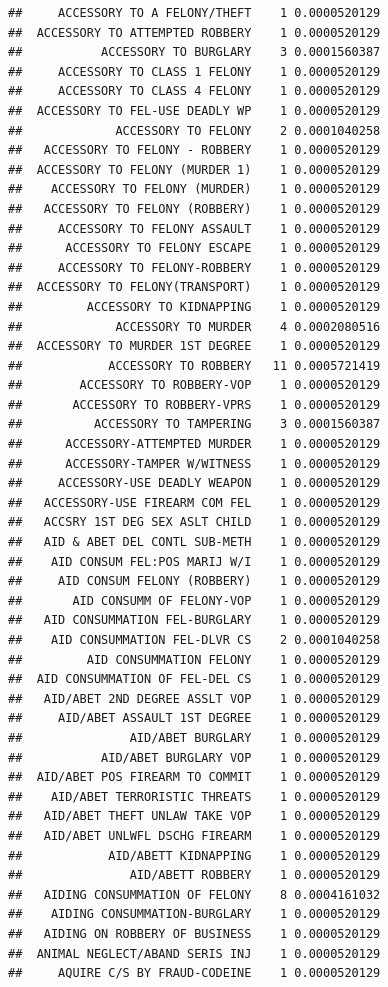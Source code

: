 \documentclass[]{book}
\begin{document}
\begin{verbatim}
##     ACCESSORY TO A FELONY/THEFT    1 0.0000520129
##  ACCESSORY TO ATTEMPTED ROBBERY    1 0.0000520129
##           ACCESSORY TO BURGLARY    3 0.0001560387
##     ACCESSORY TO CLASS 1 FELONY    1 0.0000520129
##     ACCESSORY TO CLASS 4 FELONY    1 0.0000520129
##  ACCESSORY TO FEL-USE DEADLY WP    1 0.0000520129
##             ACCESSORY TO FELONY    2 0.0001040258
##   ACCESSORY TO FELONY - ROBBERY    1 0.0000520129
##  ACCESSORY TO FELONY (MURDER 1)    1 0.0000520129
##    ACCESSORY TO FELONY (MURDER)    1 0.0000520129
##   ACCESSORY TO FELONY (ROBBERY)    1 0.0000520129
##     ACCESSORY TO FELONY ASSAULT    1 0.0000520129
##      ACCESSORY TO FELONY ESCAPE    1 0.0000520129
##     ACCESSORY TO FELONY-ROBBERY    1 0.0000520129
##  ACCESSORY TO FELONY(TRANSPORT)    1 0.0000520129
##         ACCESSORY TO KIDNAPPING    1 0.0000520129
##             ACCESSORY TO MURDER    4 0.0002080516
##  ACCESSORY TO MURDER 1ST DEGREE    1 0.0000520129
##            ACCESSORY TO ROBBERY   11 0.0005721419
##        ACCESSORY TO ROBBERY-VOP    1 0.0000520129
##       ACCESSORY TO ROBBERY-VPRS    1 0.0000520129
##          ACCESSORY TO TAMPERING    3 0.0001560387
##      ACCESSORY-ATTEMPTED MURDER    1 0.0000520129
##      ACCESSORY-TAMPER W/WITNESS    1 0.0000520129
##     ACCESSORY-USE DEADLY WEAPON    1 0.0000520129
##   ACCESSORY-USE FIREARM COM FEL    1 0.0000520129
##   ACCSRY 1ST DEG SEX ASLT CHILD    1 0.0000520129
##   AID & ABET DEL CONTL SUB-METH    1 0.0000520129
##    AID CONSUM FEL:POS MARIJ W/I    1 0.0000520129
##     AID CONSUM FELONY (ROBBERY)    1 0.0000520129
##       AID CONSUMM OF FELONY-VOP    1 0.0000520129
##   AID CONSUMMATION FEL-BURGLARY    1 0.0000520129
##    AID CONSUMMATION FEL-DLVR CS    2 0.0001040258
##         AID CONSUMMATION FELONY    1 0.0000520129
##  AID CONSUMMATION OF FEL-DEL CS    1 0.0000520129
##   AID/ABET 2ND DEGREE ASSLT VOP    1 0.0000520129
##     AID/ABET ASSAULT 1ST DEGREE    1 0.0000520129
##               AID/ABET BURGLARY    1 0.0000520129
##           AID/ABET BURGLARY VOP    1 0.0000520129
##  AID/ABET POS FIREARM TO COMMIT    1 0.0000520129
##    AID/ABET TERRORISTIC THREATS    1 0.0000520129
##   AID/ABET THEFT UNLAW TAKE VOP    1 0.0000520129
##   AID/ABET UNLWFL DSCHG FIREARM    1 0.0000520129
##            AID/ABETT KIDNAPPING    1 0.0000520129
##               AID/ABETT ROBBERY    1 0.0000520129
##   AIDING CONSUMMATION OF FELONY    8 0.0004161032
##    AIDING CONSUMMATION-BURGLARY    1 0.0000520129
##   AIDING ON ROBBERY OF BUSINESS    1 0.0000520129
##  ANIMAL NEGLECT/ABAND SERIS INJ    1 0.0000520129
##     AQUIRE C/S BY FRAUD-CODEINE    1 0.0000520129

\end{verbatim}
\end{document}
